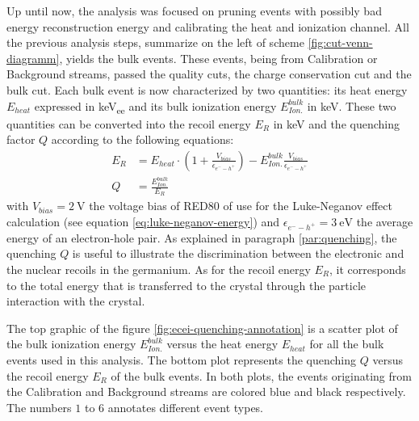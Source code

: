 Up until now, the analysis was focused on pruning events with possibly bad energy reconstruction energy and calibrating the heat and ionization channel. All the previous analysis steps, summarize on the left of scheme \ref{fig:cut-venn-diagramm}, yields the bulk events. These events, being from Calibration or Background streams, passed the quality cuts, the charge conservation cut and the bulk cut.
Each bulk event is now characterized by two quantities: its heat energy $E_{heat}$ expressed in \si{\kilo\eV_{ee}} and its bulk ionization energy 
$E_{Ion.}^{bulk}$ in \si{\kilo\eV}.
These two quantities can be converted into the recoil energy $E_R$ in \si{\kilo\eV} and the quenching factor $Q$ according to the following equations:
\begin{align}
\label{eq:er-quenching}
E_R 
&= 
E_{heat}
\cdot
\left( 1 + \frac{V_{bias}}{\epsilon_{e^--h^+}} \right) - E_{Ion.}^{bulk} \frac{V_{bias}}{\epsilon_{e^--h^+}}
\\
Q &= \frac{E_{Ion.}^{bulk}}{E_R}
\end{align}
with $V_{bias}=\SI{2}{\volt}$ the voltage bias of RED80 of use for the Luke-Neganov effect calculation (see equation \ref{eq:luke-neganov-energy}) and $\epsilon_{e^--h^+}=\SI{3}{\eV}$ the average energy of an electron-hole pair.
As explained in paragraph \ref{par:quenching}, the quenching $Q$ is useful to illustrate the discrimination between the electronic and the nuclear recoils in the germanium. As for the recoil energy $E_R$, it corresponds to the total energy that is transferred to the crystal through the particle interaction with the crystal.

The top graphic of the figure \ref{fig:ecei-quenching-annotation} is a scatter plot of the bulk ionization energy $E_{Ion.}^{bulk}$ versus the heat energy $E_{heat}$ for all the bulk events used in this analysis. The bottom plot represents the quenching $Q$ versus the recoil energy $E_R$ of the bulk events. In both plots, the events originating from the Calibration and Background streams are colored blue and black respectively. The numbers $1$ to $6$ annotates different event types.

